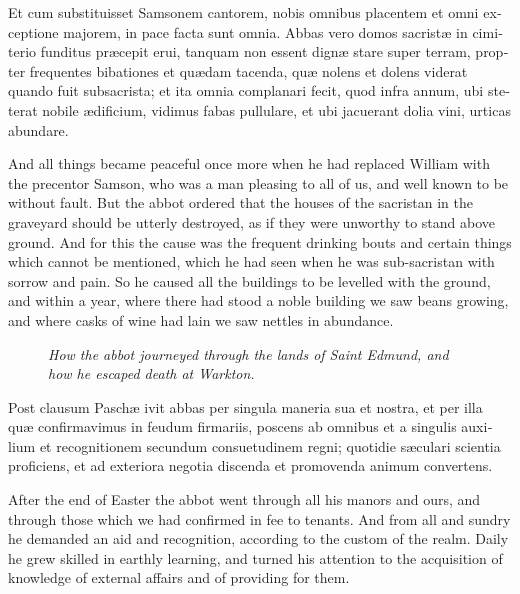\documentclass[10pt]{book}
\newcommand{\blockhead}[4][]{
\begin{figure}
\centering
\vspace{#4}
\parbox{2.75cm}{\begin{center}\footnotesize \color{BrickRed} \emph{#2}\\ #1 \end{center}}
\end{figure}
}
\begin{document}
\begin{paracol}{2}
\switchcolumn*

\begin{otherlanguage}{latin}
Et cum substituisset Samsonem cantorem, nobis omnibus placentem et omni exceptione majorem, in pace facta sunt omnia. Abbas vero domos sacrist\ae{} in cimiterio funditus pr\ae{}cepit erui, tanquam non essent dign\ae{} stare super terram, propter frequentes bibationes et qu\ae{}dam tacenda, qu\ae{} nolens et dolens viderat quando fuit subsacrista; et ita omnia complanari fecit, quod infra annum, ubi steterat nobile \ae{}dificium, vidimus fabas pullulare, et ubi jacuerant dolia vini, urticas abundare.
\end{otherlanguage}

\switchcolumn

And all things became peaceful once more when he had replaced William with the precentor Samson, who was a man pleasing to all of us, and well known to be without fault. But the abbot ordered that the houses of the sacristan in the graveyard should be utterly destroyed, as if they were unworthy to stand above ground. And for this the cause was the frequent drinking bouts and certain things which cannot be mentioned, which he had seen when he was sub-sacristan with sorrow and pain. So he caused all the buildings to be levelled with the ground, and within a year, where there had stood a noble building we saw beans growing, and where casks of wine had lain we saw nettles in abundance.

\switchcolumn*

\begin{otherlanguage}{latin}
\blockhead{How the abbot journeyed through the lands of Saint Edmund, and how he escaped death at Warkton.}{4}{-0.65cm}
Post clausum Pasch\ae{} ivit abbas per singula maneria sua et nostra, et per illa qu\ae{} confirmavimus in feudum firmariis, poscens ab omnibus et a singulis auxilium et recognitionem secundum consuetudinem regni; quotidie s\ae{}culari scientia proficiens, et ad exteriora negotia discenda et promovenda animum convertens.

\end{otherlanguage}

\switchcolumn

After the end of Easter the abbot went through all his manors and ours, and through those which we had confirmed in fee to tenants. And from all and sundry he demanded an aid and recognition, according to the custom of the realm. Daily he grew skilled in earthly learning, and turned his attention to the acquisition of knowledge of external affairs and of providing for them.


\end{paracol}
\end{document}
